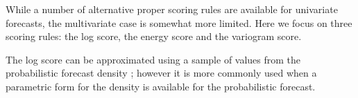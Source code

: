 \documentclass[a4paper, 11pt]{article}
\def\E{\text{E}}
\theoremstyle{definition}
\begin{document}
While a number of alternative proper scoring rules are available for univariate forecasts, the multivariate case is somewhat more limited. Here we focus on three scoring rules: the log score, the energy score and the variogram score. %
%

The log score can be approximated using a sample of values from the probabilistic forecast density \citep{Jordan2017}; however it is more commonly used when a parametric form for the density is available for the probabilistic forecast.
\end{document}
